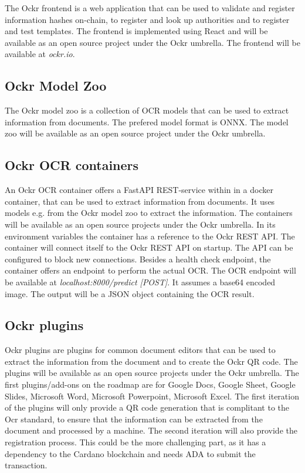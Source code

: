 \documentclass[../ockr-specification.tex]{subfiles}
\begin{document}
The Ockr frontend is a web application that can be used to validate and register information hashes on-chain, to register and look up authorities and to register and test templates. The frontend is implemented using React and will be available as an open source project under the Ockr umbrella. The frontend will be available at \textit{ockr.io}.

\subsection{Ockr Model Zoo}

The Ockr model zoo is a collection of OCR models that can be used to extract information from documents. The prefered model format is ONNX. The model zoo will be available as an open source project under the Ockr umbrella.

\subsection{Ockr OCR containers}

An Ockr OCR container offers a FastAPI REST-service within in a docker container, that can be used to extract information from documents. It uses models e.g. from the Ockr model zoo to extract the information. The containers will be available as an open source projects under the Ockr umbrella. In its environment variables the container has a reference to the Ockr REST API. The container will connect itself to the Ockr REST API on startup. The API can be configured to block new connections. Besides a health check endpoint, the container offers an endpoint to perform the actual OCR. The OCR endpoint will be available at \textit{localhost:8000/predict [POST]}. It assumes a base64 encoded image. The output will be a JSON object containing the OCR result.

\subsection{Ockr plugins}

Ockr plugins are plugins for common document editors that can be used to extract the information from the document and to create the Ockr QR code. The plugins will be available as an open source projects under the Ockr umbrella. The first plugins/add-ons on the roadmap are for Google Docs, Google Sheet, Google Slides, Microsoft Word, Microsoft Powerpoint, Microsoft Excel. The first iteration of the plugins will only provide a QR code generation that is complitant to the Ocr standard, to ensure that the information can be extracted from the document and processed by a machine. The second iteration will also provide the registration process. This could be the more challenging part, as it has a dependency to the Cardano blockchain and needs ADA to submit the transaction.
\end{document}
